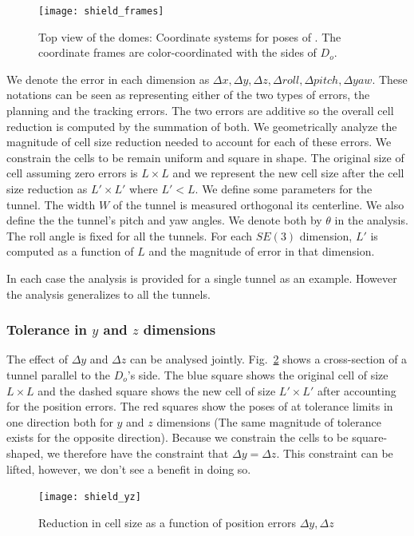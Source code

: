 \documentclass[a4paper]{report}
\begin{document}
\begin{figure}[ht]
\centering
\texttt{[image: shield\_frames]}
\caption{Top view of the domes: Coordinate systems for poses of \calS. The coordinate frames are color-coordinated with the sides of $D_o$.}
\label{fig:shield_frames}
\end{figure}

We denote the error in each dimension as $\Delta x,\Delta y, \Delta z,\Delta roll,\Delta pitch,\Delta yaw$. These notations can be seen as representing either of the two types of errors, the planning and the tracking errors. The two errors are additive so the overall cell reduction is computed by the summation of both.
%
We geometrically analyze the magnitude of cell size reduction needed to account for each of these errors. We constrain the cells to be remain uniform and square in shape. The original size of cell assuming zero errors is $L \times L$ and we represent the new cell size after the cell size reduction as $L' \times L'$ where $L' < L$.
%
We define some parameters for the tunnel. The width $W$ of the tunnel is measured orthogonal its centerline. We also define the the tunnel's pitch and yaw angles. We denote both by $\theta$ in the analysis. The roll angle is fixed for all the tunnels.
%
For each $SE(3)$ dimension, $L'$ is computed as a function of $L$ and the magnitude of error in that dimension.

In each case the analysis is provided for a single tunnel as an example. However the analysis generalizes to all the tunnels.
%

\subsubsection{Tolerance in $y$ and $z$ dimensions}
The effect of $\Delta y$ and $\Delta z$ can be analysed jointly. Fig.~\ref{fig:shield_yz} shows a cross-section of a tunnel parallel to the $D_o$'s side. The blue square shows the original cell of size $L \times L$ and the dashed square shows the new cell of size $L' \times L'$ after accounting for the position errors. The red squares show the poses of \calS at tolerance limits in one direction both for $y$ and $z$ dimensions (The same magnitude of tolerance exists for the opposite direction). Because we constrain the cells to be square-shaped, we therefore have the constraint that $\Delta y = \Delta z$. This constraint can be lifted, however, we don't see a benefit in doing so.

\begin{figure}[ht]
\centering
\texttt{[image: shield\_yz]}
\caption{Reduction in cell size as a function of position errors $\Delta y, \Delta z$}
\label{fig:shield_yz}
\end{figure}
\end{document}
